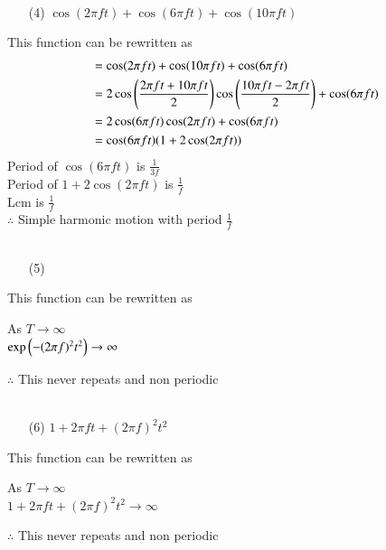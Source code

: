 \documentclass[journal,12pt,twocolumn]{IEEEtran}
\theoremstyle{remark}
\begin{document}
 \\
 \begin{enumerate}
 \item[(4)]  $\cos(2\pi f t)+\cos(6\pi  f t)+\cos(10\pi  f t)$\\
\end{enumerate}
This function can be rewritten as\\ 
 \begin{align}
  &=\cos(2\pi f t)+\cos(10\pi  f t)+\cos(6\pi  f t)\\
  &=2\cos\left(\frac{2\pi f t+10\pi f t}{2}\right)\cos\left(\frac{10\pi  f t-2\pi f t}{2}\right) +\cos(6\pi  f t)\\
  &=2\cos(6\pi  f t) \cos(2\pi f t)+\cos(6\pi  f t)\\
  &=\cos(6\pi  f t) (1+2\cos(2\pi f t))
 \end{align}
 Period of $\cos(6\pi  f t)$ is $\frac{1}{3f}$\\ 
 Period of $1+2\cos(2\pi f t)$ is $\frac{1}{f}$\\ 
 Lcm is $\frac{1}{f}$\\
 $\therefore$  Simple harmonic motion with period $\frac{1}{f}$\\
 \\
 \begin{enumerate}
 \item[(5)]  \\
\end{enumerate}
This function can be rewritten as\\ 
       \begin{center}
     As $T\to\infty$\\
    $\text{exp}\left(-(2\pi f)^2 t^2\right)\to \infty$\\ 
       \end{center}
    $\therefore$  This never repeats and non periodic\\
    \\
    \begin{enumerate}
 \item[(6)] $1+2\pi f t+(2\pi f)^2t^2$\\
\end{enumerate}
This function can be rewritten as\\ 
 \begin{center}
  As $T\to\infty$\\
  $1+2\pi f t+(2\pi f)^2t^2  \to \infty$\\
  \end{center}
  $\therefore$ This never repeats and non periodic\\ 
 
\end{document}

